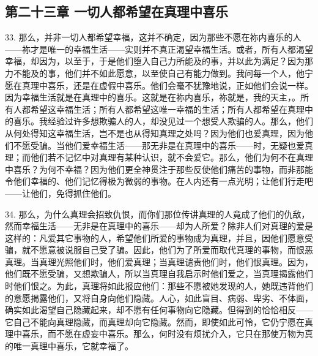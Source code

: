 
\subsection{第二十三章 一切人都希望在真理中喜乐}

33. 那么，并非一切人都希望幸福，这并不确定，因为那些不愿在祢内喜乐的人——祢才是唯一的幸福生活——实则并不真正渴望幸福生活。或者，所有人都渴望幸福，却因为，以至于，于是他们堕入自己力所能及的事，并以此为满足？因为那力不能及的事，他们并不如此愿意，以至使自己有能力做到。我问每一个人，他宁愿在真理中喜乐，还是在虚假中喜乐。他们会毫不犹豫地说，正如他们会说一样。因为幸福生活就是在真理中的喜乐。这就是在祢内喜乐，祢就是，我的天主，。所有人都希望这幸福生活；所有人都希望这唯一幸福的生活；所有人都希望在真理中的喜乐。我经验过许多想欺骗人的人，却没见过一个想受人欺骗的人。那么，他们从何处得知这幸福生活，岂不是也从得知真理之处吗？因为他们也爱真理，因为他们不愿受骗。当他们爱幸福生活——那无非是在真理中的喜乐——时，无疑也爱真理；而他们若不记忆中对真理有某种认识，就不会爱它。那么，他们为何不在真理中喜乐？为何不幸福？因为他们更全神贯注于那些反使他们痛苦的事物，而非那能令他们幸福的、他们记忆得极为微弱的事物。在人内还有一点光明；让他们行走吧——让他们，免得抓住他们。\par

34. 那么，为什么真理会招致仇恨，而你们那位传讲真理的人竟成了他们的仇敌，然而幸福生活——无非是在真理中的喜乐——却为人所爱？除非人们对真理的爱是这样的：凡爱其它事物的人，希望他们所爱的事物成为真理，并且，因他们愿意受骗，就不愿意被说服自己受了骗。因此，他们为了所爱而取代真理的事物，而恨恶真理。当真理光照他们时，他们爱真理；当真理谴责他们时，他们恨真理。因为，他们既不愿受骗，又想欺骗人，所以当真理自我启示时他们爱之，当真理揭露他们时他们恨之。为此，真理将如此报应他们：那些不愿被她发现的人，她既违背他们的意愿揭露他们，又将自身向他们隐藏。人心，如此盲目、病弱、卑劣、不体面，确实如此渴望自己隐藏起来，却不愿有任何事物向它隐藏。但得到的恰恰相反——它自己不能向真理隐藏，而真理却向它隐藏。然而，即使如此可怜，它仍宁愿在真理中喜乐，而不愿在虚妄中喜乐。那么，何时没有烦扰介入，它只在那使万物为真的唯一真理中喜乐，它就幸福了。\par


